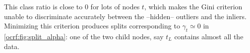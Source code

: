 This class ratio is close to $0$ for lots of nodes $t$, which makes the Gini
criterion unable to discriminate accurately between the --hidden-- outliers and
the inliers.
%
%
%
Minimizing this criterion produces splits corresponding to $\gamma_t\simeq 0$
in \cref{ocrf:fig:split_alpha}: one of the two child nodes, say $t_L$ contains
almost all the data.
%

